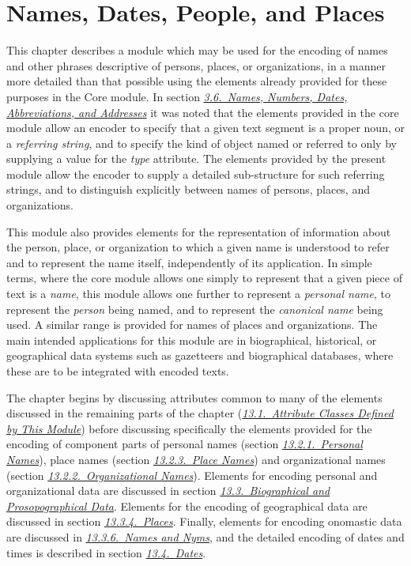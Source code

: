 
\section[{Names, Dates, People, and Places}]{Names, Dates, People, and Places}\label{ND}\par
This chapter describes a module which may be used for the encoding of names and other phrases descriptive of persons, places, or organizations, in a manner more detailed than that possible using the elements already provided for these purposes in the Core module. In section \textit{\hyperref[CONA]{3.6.\ Names, Numbers, Dates, Abbreviations, and Addresses}} it was noted that the elements provided in the core module allow an encoder to specify that a given text segment is a proper noun, or a \textit{referring string}, and to specify the kind of object named or referred to only by supplying a value for the {\itshape type} attribute. The elements provided by the present module allow the encoder to supply a detailed sub-structure for such referring strings, and to distinguish explicitly between names of persons, places, and organizations.\par
This module also provides elements for the representation of information about the person, place, or organization to which a given name is understood to refer and to represent the name itself, independently of its application. In simple terms, where the core module allows one simply to represent that a given piece of text is a \textit{name}, this module allows one further to represent a \textit{personal name}, to represent the \textit{person} being named, and to represent the \textit{canonical name} being used. A similar range is provided for names of places and organizations. The main intended applications for this module are in biographical, historical, or geographical data systems such as gazetteers and biographical databases, where these are to be integrated with encoded texts.\par
The chapter begins by discussing attributes common to many of the elements discussed in the remaining parts of the chapter (\textit{\hyperref[NDATTS]{13.1.\ Attribute Classes Defined by This Module}}) before discussing specifically the elements provided for the encoding of component parts of personal names (section \textit{\hyperref[NDPER]{13.2.1.\ Personal Names}}), place names (section \textit{\hyperref[NDPLAC]{13.2.3.\ Place Names}}) and organizational names (section \textit{\hyperref[NDORG]{13.2.2.\ Organizational Names}}). Elements for encoding personal and organizational data are discussed in section \textit{\hyperref[NDPERS]{13.3.\ Biographical and Prosopographical Data}}. Elements for the encoding of geographical data are discussed in section \textit{\hyperref[NDGEOG]{13.3.4.\ Places}}. Finally, elements for encoding onomastic data are discussed in \textit{\hyperref[NDNYM]{13.3.6.\ Names and Nyms}}, and the detailed encoding of dates and times is described in section \textit{\hyperref[NDDATE]{13.4.\ Dates}}.
